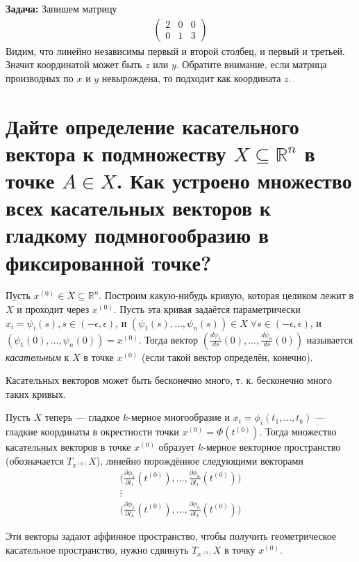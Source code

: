 \documentclass{article}
\begin{document}
\textbf{Задача:} Запишем матрицу
\begin{gather*}
\begin{pmatrix}
    2 & 0 & 0\\
    0 & 1 & 3
\end{pmatrix}
\end{gather*}
Видим, что линейно независимы первый и второй столбец, и первый и третьей. Значит координатой может быть $z$ или $y$. Обратите внимание, если матрица производных по $x$ и $y$ невырождена, то подходит как координата $z$.


\section{Дайте определение касательного вектора к подмножеству $X \subseteq \mathbb{R}^n$ в точке $A \in X$. Как устроено множество всех касательных векторов к гладкому подмногообразию в фиксированной точке?}
\begin{definition}
Пусть $x^{(0)} \in X \subseteq \mathbb{R}^n$. Построим какую-нибудь кривую, которая целиком лежит в $X$ и проходит через $x^{(0)}$. Пусть эта кривая задаётся параметрически ${x_i = \psi_i(s), s \in (-\epsilon, \epsilon)}$, и ${(\psi_1(s), \dotsc, \psi_n(s)) \in X \; \forall s\in (-\epsilon,\epsilon)}$, и $(\psi_1(0),\dotsc,\psi_n(0)) = x^{(0)}$. Тогда вектор $(\frac{d\psi_1}{ds}(0),\dotsc,\frac{d\psi_n}{ds}(0))$ называется \textit{касательным} к $X$ в точке $x^{(0)}$ (если такой вектор определён, конечно).
\end{definition}
\begin{remark}
Касательных векторов может быть бесконечно много, т. к. бесконечно много таких кривых.
\end{remark}
Пусть $X$ теперь --- гладкое $k$-мерное многообразие и $x_i=\phi_i(t_1,\dotsc,t_k)$ --- гладкие координаты в окрестности точки $x^{(0)} = \Phi(t^{(0)})$. Тогда множество касательных векторов в точке $x^{(0)}$ образует $k$-мерное векторное пространство (обозначается $T_{x^{(0)}}X$), линейно порождённое следующими векторами
\begin{gather*}
    \Big(\frac{\partial \phi_1}{\partial t_1}(t^{(0)}),\dotsc,\frac{\partial \phi_n}{\partial t_1}(t^{(0)})\Big)\\
    \vdots\\
    \Big(\frac{\partial \phi_1}{\partial t_k}(t^{(0)}),\dotsc,\frac{\partial \phi_n}{\partial t_k}(t^{(0)})\Big)
\end{gather*}
\begin{remark}
Эти векторы задают аффинное пространство, чтобы получить геометрическое касательное пространство, нужно сдвинуть $T_{x^{(0)}}X$ в точку $x^{(0)}$.
\end{remark}
\end{document}
